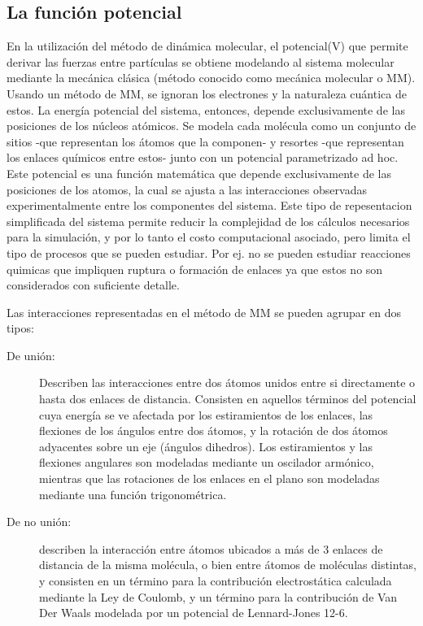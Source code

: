 \documentclass[a4paper,10pt]{report}
\begin{document}
\subsection{La función potencial}


En la utilización del método de dinámica molecular, el potencial(V) que permite derivar las fuerzas entre partículas se obtiene modelando al sistema molecular mediante la mecánica clásica (método conocido como mecánica molecular o MM).
Usando un método de MM, se ignoran los electrones y la naturaleza cuántica de estos. La energía potencial del sistema, entonces, depende exclusivamente de las posiciones de los núcleos atómicos. Se modela cada molécula como un conjunto de sitios -que representan los átomos que la componen- y resortes -que representan los enlaces químicos entre estos- junto con un potencial parametrizado ad hoc.
Este potencial es una función matemática que depende exclusivamente de las posiciones de los atomos, la cual se ajusta a las interacciones observadas experimentalmente entre los componentes del sistema. Este tipo de repesentacion simplificada del sistema permite reducir la complejidad de los cálculos necesarios para la simulación, y por lo tanto el costo computacional asociado, pero limita el tipo de procesos que se pueden estudiar. Por ej. no se pueden estudiar reacciones quimicas que impliquen ruptura o formación de enlaces ya que estos no son considerados con suficiente detalle.

Las interacciones representadas en el método de MM se pueden agrupar en dos tipos:

\begin{description}
 \item [De unión:] Describen las interacciones entre dos átomos unidos entre si directamente o hasta dos enlaces de distancia. 
 Consisten en aquellos términos del potencial cuya energía se ve afectada por los estiramientos de los enlaces, las flexiones de los ángulos entre dos átomos, y la rotación de dos átomos adyacentes sobre un eje (ángulos dihedros). Los estiramientos y las flexiones angulares son modeladas
mediante un oscilador armónico, mientras que las rotaciones de los enlaces en el plano son modeladas mediante una función trigonométrica.

\item [De no unión:] describen la interacción entre átomos ubicados a más de 3 enlaces de distancia de la misma molécula, o bien entre átomos de moléculas distintas, y consisten en un término para la
contribución electrostática calculada mediante la Ley de Coulomb, y un término para la contribución de Van Der Waals modelada por un potencial de Lennard-Jones 12-6.


\end{description}
\end{document}
